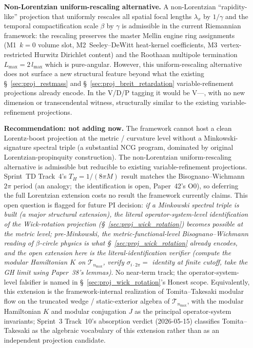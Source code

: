 \documentclass[11pt]{article}
\begin{document}
\begin{enumerate}
\textbf{Non-Lorentzian uniform-rescaling alternative.}  A
non-Lorentzian ``rapidity-like'' projection that uniformly rescales
all spatial focal lengths $\lambda_x$ by $1/\gamma$ and the
temporal compactification scale $\beta$ by $\gamma$ is admissible
in the current Riemannian framework: the rescaling preserves the
master Mellin engine ring assignments
(M1~$k = 0$ volume slot, M2~Seeley--DeWitt heat-kernel coefficients,
M3~vertex-restricted Hurwitz Dirichlet content) and the Roothaan
multipole termination $L_\text{max} = 2\,l_\text{max}$ which is
pure-angular.  However, this uniform-rescaling alternative does
not surface a new structural feature beyond what the existing
\S~\ref{sec:proj_restmass} and \S~\ref{sec:proj_breit_retardation}
variable-refinement projections already encode.  In the V/D/P
tagging it would be V---, with no new dimension or transcendental
witness, structurally similar to the existing variable-refinement
projections.

\textbf{Recommendation: not adding now.}  The framework cannot host
a clean Lorentz-boost projection at the metric / curvature level
without a Minkowski-signature spectral triple (a substantial NCG
program, dominated by original Lorentzian-propinquity
construction).  The non-Lorentzian uniform-rescaling alternative is
admissible but reducible to existing variable-refinement
projections.  Sprint~TD Track~4's $T_H = 1/(8\pi M)$ result
matches the Bisognano--Wichmann $2\pi$ period (an analogy;\ the
identification is open, Paper~42's O0), so deferring the full
Lorentzian extension costs no result the framework currently
claims.  This open
question is flagged for future PI decision: \emph{if a Minkowski
spectral triple is built (a major structural extension), the
literal operator-system-level identification of the Wick-rotation
projection (\S~\ref{sec:proj_wick_rotation}) becomes possible at the
metric level; pre-Minkowski, the metric-functional-level
Bisognano--Wichmann reading of $\beta$-circle physics is what
\S~\ref{sec:proj_wick_rotation} already encodes, and the open
extension here is the literal-identification verifier (compute the
modular Hamiltonian $K$ on $\mathcal{T}_{n_\text{max}}$, verify
$\sigma_{i\cdot 2\pi} = $ identity at finite cutoff, take the
GH limit using Paper~38's lemmas).}  No near-term track; the
operator-system-level falsifier is named in
\S~\ref{sec:proj_wick_rotation}'s Honest scope.  Equivalently, this
extension is the framework-internal realization of Tomita--Takesaki
modular flow on the truncated wedge / static-exterior algebra of
$\mathcal{T}_{n_{\max}}$, with the modular Hamiltonian $K$ and modular
conjugation $J$ as the principal operator-system invariants;
Sprint~3 Track~10's absorption verdict
(2026-05-15) classifies Tomita--Takesaki as the algebraic vocabulary
of this extension rather than as an independent projection candidate.


\end{enumerate}
\end{document}
